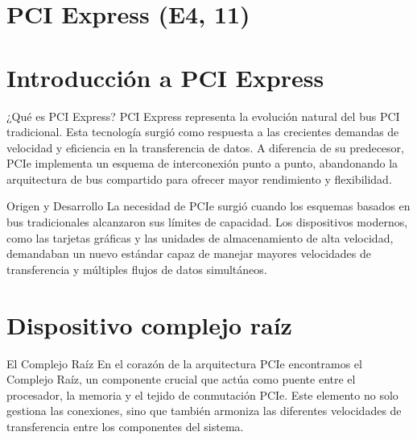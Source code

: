 \documentclass[presentation]{beamer}
\begin{document}
\section{PCI Express (E4, 11)}
\label{sec:org11be652}
\section{Introducción a PCI Express}
\label{sec:orgf6e008b}
\begin{frame}[label={sec:org388ec79}]{¿Qué es PCI Express?}
PCI Express representa la evolución natural del bus PCI tradicional. Esta tecnología surgió como respuesta a las crecientes demandas de velocidad y eficiencia en la transferencia de datos. A diferencia de su predecesor, PCIe implementa un esquema de interconexión punto a punto, abandonando la arquitectura de bus compartido para ofrecer mayor rendimiento y flexibilidad.
\end{frame}

\begin{frame}[label={sec:org4b6aa8a}]{Origen y Desarrollo}
La necesidad de PCIe surgió cuando los esquemas basados en bus tradicionales alcanzaron sus límites de capacidad. Los dispositivos modernos, como las tarjetas gráficas y las unidades de almacenamiento de alta velocidad, demandaban un nuevo estándar capaz de manejar mayores velocidades de transferencia y múltiples flujos de datos simultáneos.
\end{frame}

\section{Dispositivo complejo raíz}
\label{sec:org2a3e6ea}
\begin{frame}[label={sec:org013ca0d}]{El Complejo Raíz}
En el corazón de la arquitectura PCIe encontramos el Complejo Raíz, un componente crucial que actúa como puente entre el procesador, la memoria y el tejido de conmutación PCIe. Este elemento no solo gestiona las conexiones, sino que también armoniza las diferentes velocidades de transferencia entre los componentes del sistema.
\end{frame}
\end{document}
